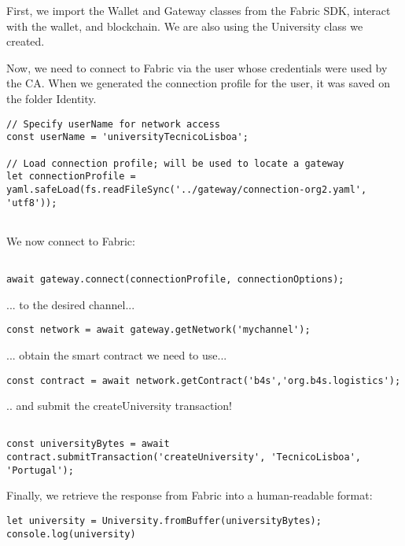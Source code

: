 \documentclass[12pt,a4paper]{article}
\theoremstyle{definition}
\begin{document}
First, we import the Wallet and Gateway classes from the Fabric SDK, interact with the wallet, and blockchain. We are also using the University class we created.

Now, we need to connect to Fabric via the user whose credentials were used by the CA. When we generated the connection profile for the user, it was saved on the folder Identity.

\begin{verbatim}
// Specify userName for network access
const userName = 'universityTecnicoLisboa';

// Load connection profile; will be used to locate a gateway
let connectionProfile = yaml.safeLoad(fs.readFileSync('../gateway/connection-org2.yaml', 'utf8'));


\end{verbatim}

We now connect to Fabric:
\begin{verbatim}

await gateway.connect(connectionProfile, connectionOptions);

\end{verbatim}


... to the desired channel...
\begin{verbatim}
const network = await gateway.getNetwork('mychannel');
\end{verbatim}


... obtain the smart contract we need to use...
\begin{verbatim}
const contract = await network.getContract('b4s','org.b4s.logistics');

\end{verbatim}

.. and submit the createUniversity transaction!
\begin{verbatim}

const universityBytes = await contract.submitTransaction('createUniversity', 'TecnicoLisboa', 'Portugal');

\end{verbatim}



Finally, we retrieve the response from Fabric into a human-readable format:

\begin{verbatim}
let university = University.fromBuffer(universityBytes);
console.log(university)


\end{verbatim}
\end{document}
